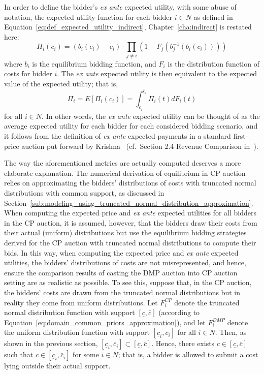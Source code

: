 In order to define the bidder's \emph{ex ante} expected utility, with some abuse of notation, the expected utility function for each bidder $i\in N$ as defined in Equation~\eqref{eq:def_expected_utility_indirect}, Chapter~\ref{cha:indirect} is restated here:
\begin{equation}
  \label{eq:expected_utility_approximation}
  \Pi_i(c_i) = (b_i(c_i) - c_i)\cdot \prod_{j\neq i} \left( 1 - F_j(b_j^{-1}(b_i(c_i))) \right)
\end{equation}
where $b_i$ is the equilibrium bidding function, and $F_i$ is the distribution function of costs for bidder $i$. The \emph{ex ante} expected utility is then equivalent to the expected value of the expected utility; that is,
\begin{equation}
  \label{eq:ex_ante_expected_utility_approximation}
  \Pi_i = E[\Pi_i(c_i)] = \int_{\underline{c}_i}^{\bar{c}_i} \Pi_i(t)dF_i(t)
\end{equation}
for all $i\in N$. In other words, the \emph{ex ante} expected utility can be thought of as the average expected utility for each bidder for each considered bidding scenario, and it follows from the definition of \emph{ex ante} expected payments in a standard first-price auction put forward by Krishna~\cite{Krishna10} (cf.~Section 2.4 Revenue Comparison in~\cite{Krishna10}).

The way the aforementioned metrics are actually computed deserves a more elaborate explanation. The numerical derivation of equilibrium in CP auction relies on approximating the bidders' distributions of costs with truncated normal distributions with common support, as discussed in Section~\ref{sub:modeling_using_truncated_normal_distribution_approximation}. When computing the expected price and \emph{ex ante} expected utilities for all bidders in the CP auction, it is assumed, however, that the bidders draw their costs from their actual (uniform) distributions but use the equilibrium bidding strategies derived for the CP auction with truncated normal distributions to compute their bids. In this way, when computing the expected price and \emph{ex ante} expected utilities, the bidders' distributions of costs are not misrepresented, and hence, ensure the comparison results of casting the DMP auction into CP auction setting are as realistic as possible. To see this, suppose that, in the CP auction, the bidders' costs are drawn from the truncated normal distributions but in reality they come from uniform distributions. Let $F_i^{CP}$ denote the truncated normal distribution function with support $[\underline{c}, \bar{c}]$ (according to Equation~\eqref{eq:domain_common_priors_approximation}), and let $F_i^{DMP}$ denote the uniform distribution function with support $[\underline{c}_i, \bar{c}_i]$ for all $i\in N$. Then, as shown in the previous section, $[\underline{c}_i,\bar{c}_i]\subset [\underline{c}, \bar{c}]$. Hence, there exists $c\in [\underline{c}, \bar{c}]$ such that $c\in [\underline{c}_i, \bar{c}_i]$ for some $i\in N$; that is, a bidder is allowed to submit a cost lying outside their actual support.

